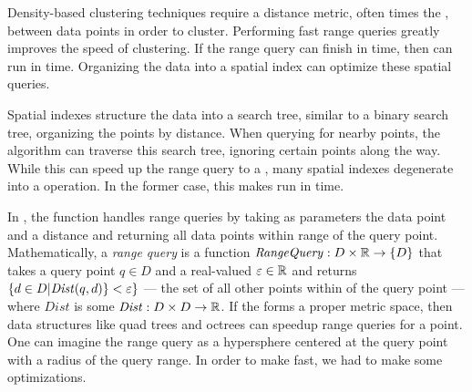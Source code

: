 Density-based clustering techniques require a distance metric, often times the \euclid{}, between data points in order to cluster.
Performing fast range queries greatly improves the speed of clustering.
If the range query can finish in  time, then \dbscan{} can run in  time.
Organizing the data into a spatial index can optimize these spatial queries.

Spatial indexes structure the data into a search tree, similar to a binary search tree, organizing the points by distance.
When querying for nearby points, the algorithm can traverse this search tree, ignoring certain points along the way.
While this can speed up the range query to a , many spatial indexes degenerate into a  operation. In the former case, this makes \dbscan{} run in  time.

In \dbscan{}, the  function handles range quer\-ies by taking as parameters the data point and a distance and returning all data points within range of the query point.
Mathematically, a \textit{range query} is a function $\mathit{RangeQuery}: D\times \mathbb{R} \rightarrow \{D\}$ that takes a query point $q\in D$ and a real-valued $\varepsilon{}\in\mathbb{R}$ and returns $\{d\in D | \mathit{Dist}(q, d)\} < \varepsilon{}\}$ --- the set of all other points within \eps{} of the query point --- where $\mathit{Dist}$ is some \distmetric{} $\mathit{Dist}: D\times D \rightarrow \mathbb{R} $.
If the \distmetric{} forms a proper metric space, then data structures like quad trees and octrees can speedup \eps{} range queries for a point.
One can imagine the range query as a hypersphere centered at the query point with a radius of the query range.
In order to make  fast, we had to make some optimizations.



